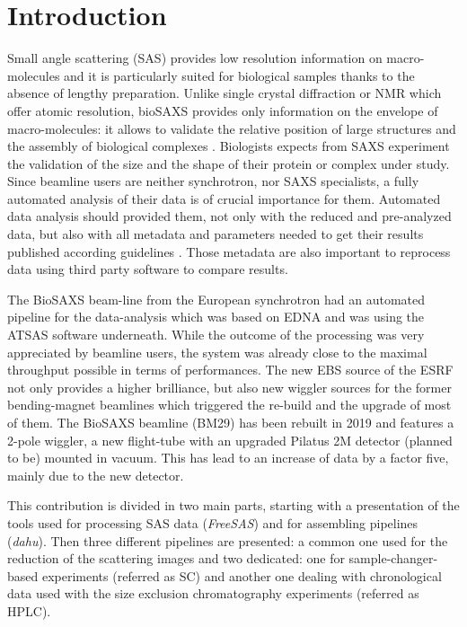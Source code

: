\documentclass[preprint]{iucr}              %
\begin{document}
\section{Introduction}
Small angle scattering (SAS) provides low resolution information on macro-molecules and it is  
particularly suited for biological samples thanks to the absence of lengthy preparation.
Unlike single crystal diffraction or NMR which offer atomic resolution, bioSAXS provides only information on the envelope of macro-molecules: it allows to validate the relative position of large structures and the assembly of biological complexes \cite{biosaxs_rev2018}. 
Biologists expects from SAXS experiment the validation of the size and the shape of their protein or complex under study. 
Since beamline users are neither synchrotron, nor SAXS specialists, a fully automated analysis of their data is of crucial importance for them. 
Automated data analysis should provided them, not only with the reduced and pre-analyzed data, but also with all metadata and parameters needed to get their results published according guidelines \cite{guidelines_2017}.
Those metadata are also important to reprocess data using third party software to compare results. 

The BioSAXS beam-line from the European synchrotron \cite{BM29paper} had an automated pipeline for the data-analysis which was based on EDNA \cite{edna} and was using the ATSAS \cite{ATSAS2} software underneath. 
While the outcome of the processing was very appreciated by beamline users, the system was already close to the maximal throughput possible in terms of performances. 
The new EBS source \cite{EBS} of the ESRF not only provides a higher brilliance, but also new wiggler sources for the former bending-magnet beamlines which triggered the re-build and the upgrade of most of them. 
The BioSAXS beamline (BM29) has been rebuilt in 2019 and features a  2-pole wiggler, a new flight-tube with an upgraded  Pilatus 2M detector (planned to be) mounted in vacuum. 
This has lead to an increase of data by a factor five, mainly due to the new detector. 

This contribution is divided in two main parts, starting with a presentation of the tools used for 
processing SAS data (\textit{FreeSAS}) and for assembling pipelines (\textit{dahu}).
Then three different pipelines are presented: a common one used for the reduction of the scattering images and two dedicated: one for sample-changer-based experiments (referred as SC) and another one dealing with chronological data used with the size exclusion chromatography experiments (referred as HPLC).
\end{document}
